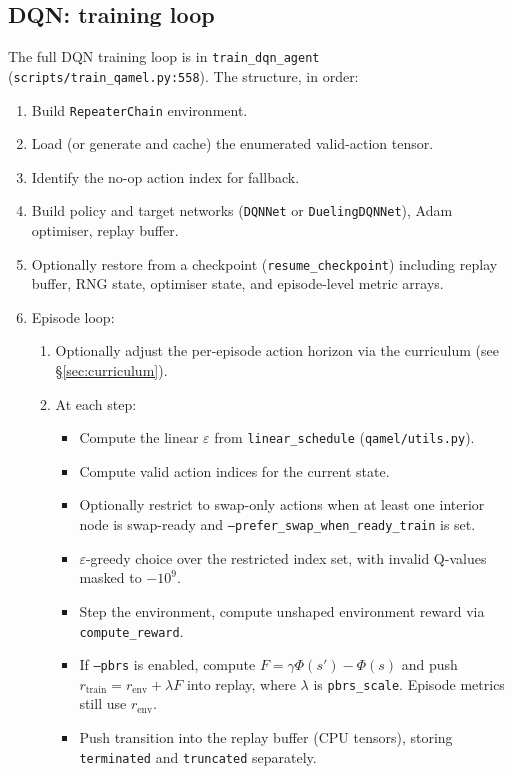 \documentclass[11pt]{article}
\newcommand{\code}[1]{\texttt{#1}}
\newcommand{\file}[1]{\texttt{\small #1}}
\begin{document}
\subsection{DQN: training loop}
The full DQN training loop is in \code{train\_dqn\_agent} (\file{scripts/train\_qamel.py:558}). The structure, in order:
\begin{enumerate}
  \item Build \code{RepeaterChain} environment.
  \item Load (or generate and cache) the enumerated valid-action tensor.
  \item Identify the no-op action index for fallback.
  \item Build policy and target networks (\code{DQNNet} or \code{DuelingDQNNet}), Adam optimiser, replay buffer.
  \item Optionally restore from a checkpoint (\code{resume\_checkpoint}) including replay buffer, RNG state, optimiser state, and episode-level metric arrays.
  \item Episode loop:
    \begin{enumerate}
      \item Optionally adjust the per-episode action horizon via the curriculum (see \S\ref{sec:curriculum}).
      \item At each step:
        \begin{itemize}
          \item Compute the linear $\varepsilon$ from \code{linear\_schedule} (\file{qamel/utils.py}).
          \item Compute valid action indices for the current state.
          \item Optionally restrict to swap-only actions when at least one interior node is swap-ready and \code{--prefer\_swap\_when\_ready\_train} is set.
          \item $\varepsilon$-greedy choice over the restricted index set, with invalid Q-values masked to $-10^9$.
          \item Step the environment, compute unshaped environment reward via \code{compute\_reward}.
          \item If \code{--pbrs} is enabled, compute $F=\gamma\Phi(s')-\Phi(s)$ and push $r_{\text{train}}=r_{\text{env}}+\lambda F$ into replay, where $\lambda$ is \code{pbrs\_scale}. Episode metrics still use $r_{\text{env}}$.
          \item Push transition into the replay buffer (CPU tensors), storing \code{terminated} and \code{truncated} separately.

\end{itemize}
\end{enumerate}
\end{enumerate}
\end{document}
